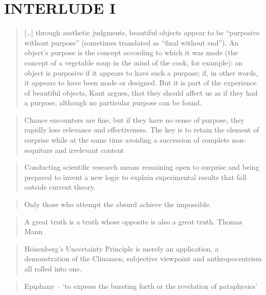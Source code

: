 
\pagestyle{empty}

\chapter*{INTERLUDE I}
\label{interlude1}


\begin{quotation}
  [\ldots] through aesthetic judgments, beautiful objects appear to be ``purposive without purpose'' (sometimes translated as ``final without end''). An object's purpose is the concept according to which it was made (the concept of a vegetable soup in the mind of the cook, for example); an object is purposive if it appears to have such a purpose; if, in other words, it appears to have been made or designed. But it is part of the experience of beautiful objects, Kant argues, that they should affect us as if they had a purpose, although no particular purpose can be found. 
\end{quotation}

\begin{quotation}
    Chance encounters are fine, but if they have no sense of purpose, they rapidly lose relevance and effectiveness. The key is to retain the element of surprise while at the same time avoiding a succession of complete non-sequiturs and irrelevant content 
\end{quotation}

\begin{quotation}
    Conducting scientific research means remaining open to surprise and being prepared to invent a new logic to explain experimental results that fall outside current theory. 
\end{quotation}

\begin{quotation}
    Only those who attempt the absurd achieve the impossible. 
\end{quotation}

\begin{quotation}
    A great truth is a truth whose opposite is also a great truth. Thomas Mann 
\end{quotation}

\begin{quotation}
    Heisenberg's Uncertainty Principle is merely an application, a demonstration of the Clinamen, subjective viewpoint and anthropocentrism all rolled into one. 
\end{quotation}

\begin{quotation}
  Epiphany – `to express the bursting forth or the revelation of pataphysics' 
\end{quotation}

\clearpage